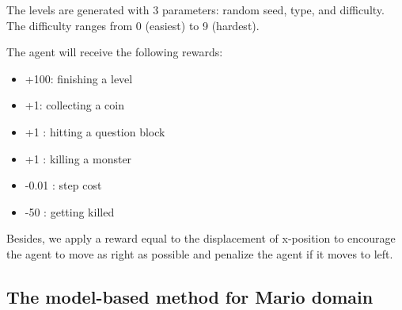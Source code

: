 The levels are generated with 3 parameters: random seed, type, and difficulty.
The difficulty ranges from 0 (easiest) to 9 (hardest). 

The agent will receive the following rewards:
\begin{itemize}
\item +100: finishing a level
\item +1: collecting a coin
\item +1 : hitting a question block
\item +1 : killing a monster
\item -0.01 : step cost
\item -50 : getting killed
\end{itemize}

Besides, we apply a reward equal to the
displacement of x-position to encourage the agent to move as right as possible
and penalize the agent if it moves to left.


\subsection{The model-based method for Mario domain}

